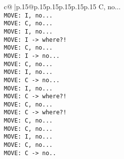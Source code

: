 \documentclass{article}
\begin{document}
{\begin{supertabular}{c@{$\;$}|p{.15\linewidth}@{}p{.15\linewidth}p{.15\linewidth}p{.15\linewidth}p{.15\linewidth}p{.15\linewidth}}
{{{C, no...\\ \tt  MOVE: I, no...\\ \tt  MOVE: C, no...\\ \tt  MOVE: I, no...\\ \tt  MOVE: I -> where?!\\ \tt  MOVE: C, no...\\ \tt  MOVE: I -> no...\\ \tt  MOVE: C, no...\\ \tt  MOVE: I, no...\\ \tt  MOVE: C -> no...\\ \tt  MOVE: I, no...\\ \tt  MOVE: C -> where?!\\ \tt  MOVE: C, no...\\ \tt  MOVE: C -> where?!\\ \tt  MOVE: C, no...\\ \tt  MOVE: C, no...\\ \tt  MOVE: I, no...\\ \tt  MOVE: C, no...\\ \tt  MOVE: C -> no..}}}
\end{supertabular}}
\end{document}
